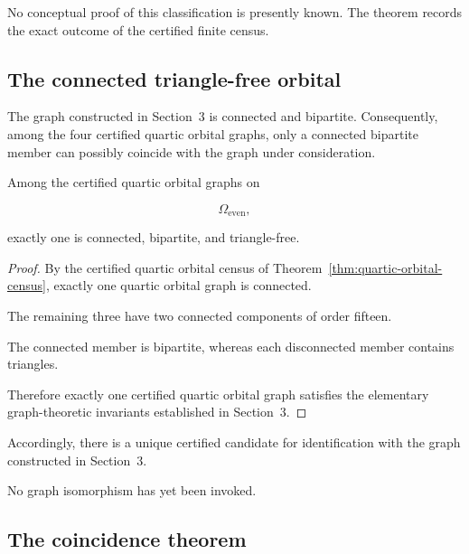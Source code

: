 No conceptual proof of this classification is presently known.
The theorem records the exact outcome of the certified finite census.


\subsection{The connected triangle-free orbital}


The graph constructed in Section~3 is connected and bipartite.
Consequently, among the four certified quartic orbital graphs, only a
connected bipartite member can possibly coincide with the graph under
consideration.

\begin{proposition}

Among the certified quartic orbital graphs on

\[
\Omega_{\mathrm{even}},
\]

exactly one is connected, bipartite, and triangle-free.

\end{proposition}

\begin{proof}

By the certified quartic orbital census of Theorem~\ref{thm:quartic-orbital-census}, exactly one
quartic orbital graph is connected.

The remaining three have two connected components of order fifteen.

The connected member is bipartite, whereas each disconnected member
contains triangles.

Therefore exactly one certified quartic orbital graph satisfies the
elementary graph-theoretic invariants established in Section~3.

\end{proof}

Accordingly, there is a unique certified candidate for identification with
the graph constructed in Section~3.

No graph isomorphism has yet been invoked.


\subsection{The coincidence theorem}


